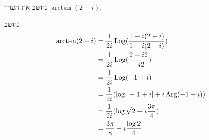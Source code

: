 \Subquestion{}
נחשב את הערך $\arctan(2 - i)$.
\begin{solution}
	נחשב
	\begin{align*}
		\arctan(2 - i)
		& = \frac{1}{2i} \operatorname{Log}(\frac{1 + i(2 - i)}{1 - i(2 - i)}) \\
		& = \frac{1}{2i} \operatorname{Log}(\frac{2 + i2}{-i2}) \\
		& = \frac{1}{2i} \operatorname{Log}(-1 + i) \\
		& = \frac{1}{2i} (\log|-1 + i| + i\operatorname{Arg}(-1 + i)) \\
		& = \frac{1}{2i} (\log \sqrt{2} + i \frac{3 \pi}{4}) \\
		& = \frac{3 \pi}{8} - i\frac{\log 2}{4}
	\end{align*}
\end{solution}

